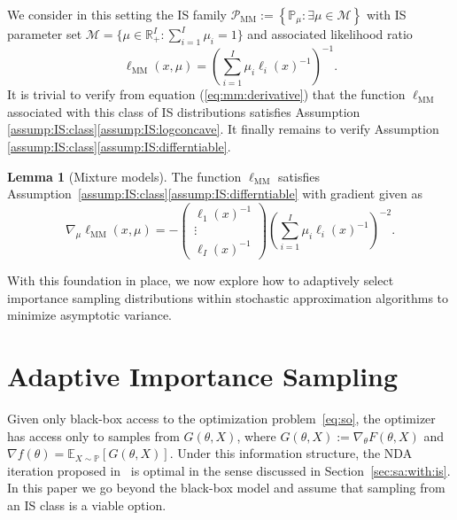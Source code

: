 \documentclass[11pt,a4paper]{article}
\theoremstyle{definition}
\newtheorem{lemma}[theorem]{Lemma}
\DeclareMathOperator*{\MM}{MM}
\newcommand{\set}[2]{\left\{ #1 : #2 \right\}}
\newcommand{\tset}[2]{\{ #1 : #2 \}}
\newcommand{\mc}{\mathcal}
\newcommand{\mb}{\mathbb}
\newcommand{\defn}{:=}
\begin{document}
We consider in this setting the IS family $\mc P_{\MM} \defn \set{\mb P_\mu}{\exists \mu\in \mc M}$ with IS parameter set $\mathcal M = \tset{\mu\in \mathbb R_+^I}{\sum_{i=1}^I \mu_i=1}$ and associated likelihood ratio
\begin{equation}
  \label{eq:mm:derivative}
  \ell_{\MM}(x, \mu) = \left(\textstyle\sum_{i=1}^I\mu_i \ell_i(x)^{-1}\right)^{-1}.
\end{equation}
It is trivial to verify from equation (\ref{eq:mm:derivative}) that the function $\ell_{\MM}$ associated with this class of IS distributions satisfies Assumption \ref{assump:IS:class}\ref{assump:IS:logconcave}.
It finally remains to verify Assumption \ref{assump:IS:class}\ref{assump:IS:differntiable}.

\begin{lemma}[Mixture models]
\label{lemma:MM:assump:IS}
The function $\ell_{\MM}$ satisfies Assumption~\ref{assump:IS:class}\ref{assump:IS:differntiable} with gradient given as
\[
  \nabla_\mu \ell_{\MM}(x,\mu) =
  -
  \begin{pmatrix}
    \ell_1(x)^{-1}\\
    \vdots\\
    \ell_I(x)^{-1}
  \end{pmatrix}
  \left(\textstyle\sum_{i=1}^I\mu_i \ell_i(x)^{-1}\right)^{-2}.   
\]
\end{lemma}

With this foundation in place, we now explore how to adaptively select importance sampling distributions within stochastic approximation algorithms to minimize asymptotic variance.


\section{Adaptive Importance Sampling}
\label{sec:SO:with:IS}

Given only black-box access to the optimization problem~\eqref{eq:so}, the optimizer has access only to samples from $G(\theta, X)$, where $G(\theta, X) \defn \nabla_{\theta} F(\theta, X)$ and $\nabla f(\theta) = \mathbb{E}_{X \sim \mathbb{P}}\!\left[ G(\theta, X) \right]$. Under this information structure, the NDA iteration proposed in~\cite{duchi2021asymptotic} is optimal in the sense discussed in Section~\ref{sec:sa:with:is}. In this paper we go beyond the black-box model and assume that sampling from an IS class is a viable option.
\end{document}
